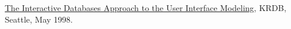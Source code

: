 \documentclass{yb}
\renewcommand\emph[1]{#1}
\begin{document}





\begin{samepage}
\emph{\href{https://www.yegor256.com/pdf/1998/KRDB98-article.pdf}{The Interactive Databases Approach to the User Interface Modeling}},\newline
KRDB, Seattle, May 1998.
\end{samepage}
\end{document}
